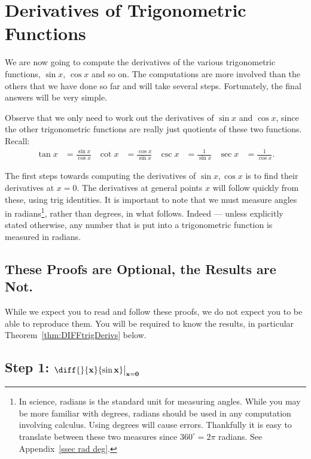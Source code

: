 \section{Derivatives of Trigonometric Functions} \label{sec diff trig}
We are now going to compute the derivatives of the various trigonometric
functions, $\sin x$, $\cos x$ and so on. The computations are more involved
than the others that we have done so far and will take several steps.
Fortunately, the final answers will be very simple.

Observe that we only need to work out the derivatives
of $\sin x$ and $\cos x$, since the other trigonometric functions are really just
quotients of these two functions. Recall:
\begin{align*}
  \tan x &= \frac{\sin x}{\cos x} &
  \cot x &= \frac{\cos x}{\sin x} &
  \csc x &= \frac{1}{\sin x} &
  \sec x &= \frac{1}{\cos x}.
\end{align*}

The first steps towards computing the derivatives of $\sin x, \cos x$ is
to find their derivatives at $x=0$. The derivatives at general points $x$
will follow quickly from these, using trig identities. It is important to note
that we must measure angles in radians\footnote{In science, radians is
the standard unit for measuring angles. While you may be more familiar
with degrees, radians should be used in any computation involving calculus.
Using degrees will cause errors.
Thankfully it is easy to translate between these two measures since $360^\circ
= 2\pi$ radians. See Appendix~\ref{ssec rad deg}.}, rather than
degrees, in what follows. Indeed --- unless
explicitly stated otherwise, any number that is put into a trigonometric
function is measured in radians.


\subsection*{These Proofs are Optional, the Results are Not.}
While we expect you to read and follow these proofs, we do not expect you to be able to
reproduce them. You will be required to know the results, in particular
Theorem~\ref{thm:DIFFtrigDerivs} below.

\subsection*{Step 1: $\mathbf{\diff{}{x} \{ \sin x \} \big|_{x=0}}$}

